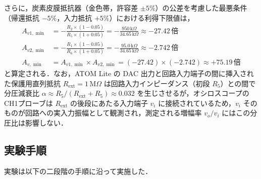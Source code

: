 \begin{enumerate}
        さらに，炭素皮膜抵抗器（金色帯，許容差 $\pm 5\%$）の公差を考慮した最悪条件（帰還抵抗 $-5\%$，入力抵抗 $+5\%$）における利得下限値は，
        \begin{align}
          A_{v1,\min} &= -\frac{R_2 \times (1 - 0.05)}{R_5 \times (1 + 0.05)} = -\frac{950\,\mathrm{k}\Omega}{34.65\,\mathrm{k}\Omega} \approx -27.42\,\text{倍} \label{eq:gain1_min} \\
          A_{v2,\min} &= -\frac{R_1 \times (1 - 0.05)}{R_6 \times (1 + 0.05)} = -\frac{95.0\,\mathrm{k}\Omega}{34.65\,\mathrm{k}\Omega} \approx -2.742\,\text{倍} \label{eq:gain2_min} \\
          A_{v,\min}  &= A_{v1,\min} \times A_{v2,\min} = (-27.42) \times (-2.742) \approx +75.19\,\text{倍} \label{eq:total_gain_min}
        \end{align}
        と算定される．なお，ATOM Lite の DAC 出力と回路入力端子の間に挿入された保護用直列抵抗 $R_{\mathrm{ext}} = 1\,\mathrm{M}\Omega$ は回路入力インピーダンス（初段 $R_5$）との間で分圧減衰比 $\alpha \approx R_5 / (R_{\mathrm{ext}} + R_5) \approx 0.032$ を生じさせるが，オシロスコープのCH1プローブは $R_{\mathrm{ext}}$ の後段にあたる入力端子 $v_i$ に接続されているため，$v_i$ そのものが回路への実入力振幅として観測され，測定される増幅率 $v_o / v_i$ にはこの分圧比は影響しない．
\end{enumerate}


\subsection{実験手順}

実験は以下の二段階の手順に沿って実施した．

